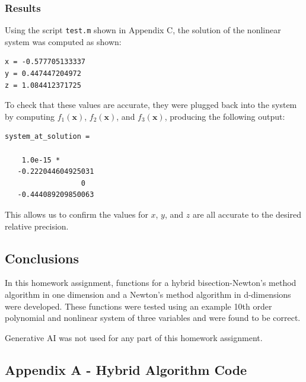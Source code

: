 \documentclass[10pt]{article}
\def\code#1{\texttt{#1}}
\begin{document}
\subsubsection*{Results}

Using the script \code{test.m} shown in Appendix C, the solution of the nonlinear system was computed 
as shown:
\begin{verbatim}
x = -0.577705133337 
y = 0.447447204972 
z = 1.084412371725 
\end{verbatim}

To check that these values are accurate, they were plugged back into the system by computing
$f_1(\mathbf{x})$, $f_2(\mathbf{x})$, and $f_3(\mathbf{x})$, producing the following output:
\begin{verbatim}
system_at_solution =

    1.0e-15 *
   -0.222044604925031
                  0
   -0.444089209850063
\end{verbatim}

This allows us to confirm the values for $x$, $y$, and $z$ are all accurate to the desired relative precision.

\pagebreak

\subsection*{Conclusions}

In this homework assignment, functions for a hybrid bisection-Newton's method algorithm in one dimension 
and a Newton's method algorithm in d-dimensions were developed. These functions were tested using an example 
10th order polynomial and nonlinear system of three variables and were found to be correct. 

Generative AI was not used for any part of this homework assignment. 

\pagebreak

\subsection*{Appendix A - Hybrid Algorithm Code}

\end{document}
